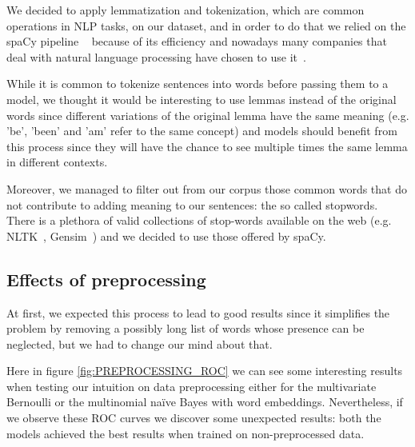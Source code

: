 We decided to apply lemmatization and tokenization, which are common operations in NLP tasks, on our dataset, and in order to do that we relied on the spaCy pipeline ~\cite{startups:spaCy} because of its efficiency and nowadays many companies that deal with natural language processing have chosen to use it~\cite{data:companies_using_spacy}.

While it is common to tokenize sentences into words before passing them to a model, we thought it would be interesting to use lemmas instead of the original words since different variations of the original lemma have the same meaning (e.g. 'be', 'been' and 'am' refer to the same concept) and models should benefit from this process since they will have the chance to see multiple times the same lemma in different contexts.

Moreover, we managed to filter out from our corpus those common words that do not contribute to adding meaning to our sentences: the so called stopwords.
There is a plethora of valid collections of stop-words available on the web (e.g. NLTK~\cite{startups:nltk}, Gensim~\cite{startups:gensim}) and we decided to use those offered by spaCy.


\subsection*{Effects of preprocessing}

At first, we expected this process to lead to good results since it simplifies the problem by removing a possibly long list of words whose presence can be neglected, but we had to change our mind about that.

Here in figure \ref{fig:PREPROCESSING_ROC} we can see some interesting results when testing our intuition on data preprocessing either for the multivariate Bernoulli or the multinomial na\"ive Bayes with word embeddings. 
Nevertheless, if we observe these ROC curves we discover some unexpected results: both the models achieved the best results when trained on non-preprocessed data.


